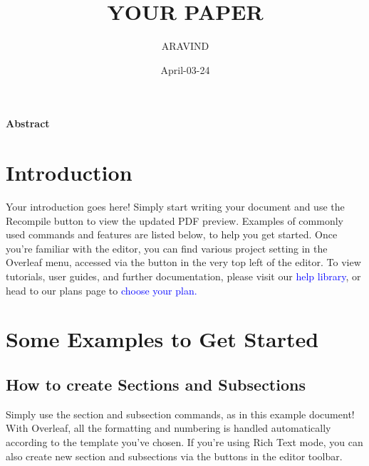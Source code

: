 \documentclass{article}
\title{YOUR PAPER}
\author{ARAVIND}
\date{April-03-24}
\begin{document}
	\maketitle
	\begin{center}
	\textbf{Abstract} 
   \end{center}
	\section{Introduction} \label{sec : intro} 
	Your introduction goes here! Simply start writing your document and use the Recompile button to
	view the updated PDF preview. Examples of commonly used commands and features are listed below,
	to help you get started.
	Once you’re familiar with the editor, you can find various project setting in the Overleaf menu,
	accessed via the button in the very top left of the editor. To view tutorials, user guides, and further
	documentation, please visit our \textcolor{blue}{ help library}, or head to our plans page to \textcolor{blue}{choose your plan.}
	\section{Some Examples to Get Started}
	\subsection{How to create Sections and Subsections}
	Simply use the section and subsection commands, as in this example document! With Overleaf, all
	the formatting and numbering is handled automatically according to the template you’ve chosen. If
	you’re using Rich Text mode, you can also create new section and subsections via the buttons in the
	editor toolbar.
\end{document}
